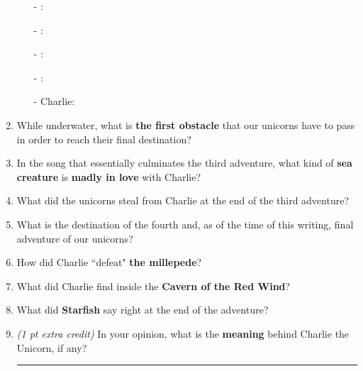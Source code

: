 \documentclass[letterpaper,12pt]{article}
\begin{document}
\begin{enumerate}[label=(\alph*)]
\begin{itemize}
							\item[-] \Blueun : \hrulefill 
							\item[-] \Redun: \hrulefill 
							\item[-] \Blueun : \hrulefill 
							\item[-] \Redun: \hrulefill 
							\item[-] Charlie: \hrulefill 
					\end{itemize}							
			\item While underwater, what is \textbf{the first obstacle} that our unicorns have to pass in order to reach their final destination? \hrulefill 
			\item In the song that essentially culminates the third adventure, what kind of \textbf{sea creature} is \textbf{madly in love} with Charlie? \hrulefill
			\item What did the unicorns steal from Charlie at the end of the third adventure? \hrulefill
			\item What is the destination of the fourth and, as of the time of this writing, final adventure of our unicorns? \hrulefill 
			\item How did Charlie ``defeat" \textbf{the millepede}? \hrulefill 
			\item What did Charlie find inside the {\bf Cavern of the Red Wind}? \hrulefill
			\item What did \textbf{Starfish} say right at the end of the adventure? \hrulefill 
			\item {\em (1 pt extra credit)} In your opinion, what is the \textbf{meaning} behind Charlie the Unicorn, if any? \\[.1in]  \hrule 
			
\end{enumerate}
\pagebreak


\end{document}
